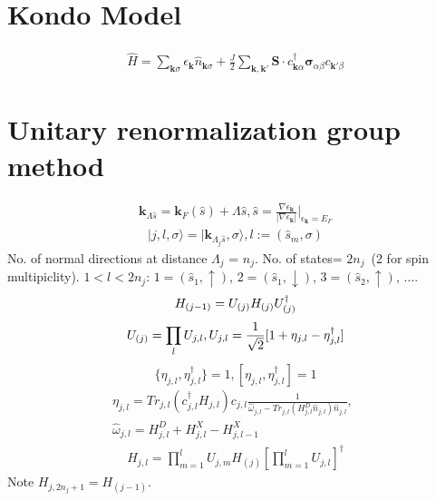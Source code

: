 \documentclass[aps,prl,preprint,groupedaddress]{revtex4-2}
\begin{document}
\section{Kondo Model}
\begin{eqnarray}
\hat{H} = \sum_{\mathbf{k}\sigma}\epsilon_{\mathbf{k}}\hat{n}_{\mathbf{k}\sigma}+\frac{J}{2}\sum_{\mathbf{k},\mathbf{k}'}\mathbf{S}\cdot c^{\dagger}_{\mathbf{k}\alpha}\boldsymbol{\sigma}_{\alpha\beta}c_{\mathbf{k}'\beta}
\end{eqnarray}
\section{Unitary renormalization group method}
\begin{eqnarray}
\mathbf{k}_{\Lambda\hat{s}}=\mathbf{k}_{F}(\hat{s})+\Lambda\hat{s}, \hat{s}=\frac{\nabla\epsilon_{\mathbf{k}}}{|\nabla\epsilon_{\mathbf{k}}|}|_{\epsilon_{\mathbf{k}}=E_{F}}
\end{eqnarray}
\begin{eqnarray}
|j,l,\sigma\rangle = |\mathbf{k}_{\Lambda_{j}\hat{s}},\sigma\rangle, l:=(\hat{s}_{m},\sigma)
\end{eqnarray}
No. of normal directions at distance $\Lambda_{j}$ = $n_{j}$. No. of states= $2n_{j}$~(2 for spin multipiclity). $1<l<2n_{j}$: $1=(\hat{s}_{1},\uparrow)$, $2=(\hat{s}_{1},\downarrow)$, $3=(\hat{s}_{2},\uparrow)$, $\ldots$. 
\begin{equation}
\centering
H_{(j-1)}=U_{(j)}H_{(j)}U^{\dagger}_{(j)}
\end{equation}
\begin{equation}
\centering
U_{(j)}=\prod_{l}U_{j,l}, U_{j,l}=\frac{1}{\sqrt{2}}[1+\eta_{j,l}-\eta^{\dagger}_{j,l}]
\end{equation}
\begin{equation}
\lbrace\eta_{j,l},\eta_{j,l}^{\dagger}\rbrace=1, \left[\eta_{j,l},\eta_{j,l}^{\dagger}\right]=1
\end{equation}
\begin{eqnarray}
\eta_{j,l}=Tr_{j,l}(c^{\dagger}_{j,l}H_{j,l})c_{j,l}\frac{1}{\hat{\omega}_{j,l}-Tr_{j,l}(H_{j,l}^{D}\hat{n}_{j,l})\hat{n}_{j,l}},~~\label{e-TransOp}\\
\hat{\omega}_{j,l}=H^{D}_{j,l}+H^{X}_{j,l}-H^{X}_{j,l-1}\label{qfOp}
\end{eqnarray}
\begin{eqnarray}
H_{j,l}=\prod_{m=1}^{l}U_{j,m}H_{(j)}[\prod_{m=1}^{l}U_{j,l}]^{\dagger}
\end{eqnarray}
Note $H_{j,2n_{j}+1}=H_{(j-1)}$.
\end{document}
